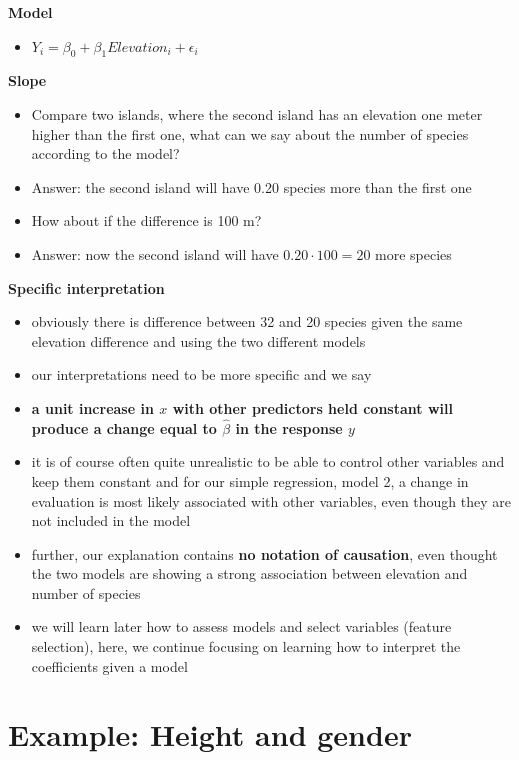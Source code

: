 \documentclass[
]{book}
\providecommand{\tightlist}{%
  \setlength{\itemsep}{0pt}\setlength{\parskip}{0pt}}
\theoremstyle{definition}
\theoremstyle{definition}
\theoremstyle{definition}
\theoremstyle{remark}
\begin{document}
\textbf{Model}

\begin{itemize}
\tightlist
\item
  \(Y_i = \beta_0 + \beta_1 Elevation_i + \epsilon_i\)
\end{itemize}

\textbf{Slope}

\begin{itemize}
\tightlist
\item
  Compare two islands, where the second island has an elevation one meter higher than the first one, what can we say about the number of species according to the model?
\item
  Answer: the second island will have 0.20 species more than the first one
\item
  How about if the difference is 100 m?
\item
  Answer: now the second island will have \(0.20 \cdot 100 = 20\) more species
\end{itemize}

\textbf{Specific interpretation}

\begin{itemize}
\tightlist
\item
  obviously there is difference between 32 and 20 species given the same elevation difference and using the two different models
\item
  our interpretations need to be more specific and we say
\item
  \textbf{a unit increase in \(x\) with other predictors held constant will produce a change equal to \(\hat{\beta}\) in the response \(y\)}
\item
  it is of course often quite unrealistic to be able to control other variables and keep them constant and for our simple regression, model 2, a change in evaluation is most likely associated with other variables, even though they are not included in the model
\item
  further, our explanation contains \textbf{no notation of causation}, even thought the two models are showing a strong association between elevation and number of species
\item
  we will learn later how to assess models and select variables (feature selection), here, we continue focusing on learning how to interpret the coefficients given a model
\end{itemize}

\hypertarget{example-height-and-gender}{%
\section{Example: Height and gender}\label{example-height-and-gender}}
\end{document}
